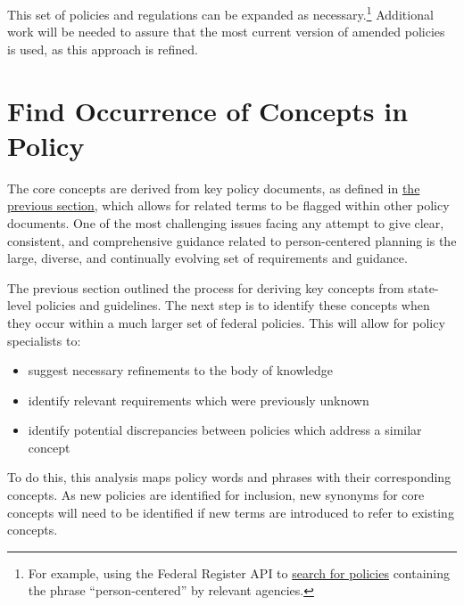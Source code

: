 \documentclass[
]{book}
\providecommand{\tightlist}{%
  \setlength{\itemsep}{0pt}\setlength{\parskip}{0pt}}
\begin{document}
This set of policies and regulations can be expanded as necessary.\footnote{For example, using the Federal Register API to \href{https://www.federalregister.gov/documents/search?conditions\%5Bagencies\%5D\%5B\%5D=centers-for-medicare-medicaid-services\&conditions\%5Bagencies\%5D\%5B\%5D=health-and-human-services-department\&conditions\%5Bagencies\%5D\%5B\%5D=substance-abuse-and-mental-health-services-administration\&conditions\%5Bterm\%5D=person-centered\&conditions\%5Btype\%5D\%5B\%5D=RULE\#}{search for policies} containing the phrase ``person-centered'' by relevant agencies.} Additional work will be needed to assure that the most current version of amended policies is used, as this approach is refined.

\hypertarget{find-occurrence-of-concepts-in-policy}{%
\section{Find Occurrence of Concepts in Policy}\label{find-occurrence-of-concepts-in-policy}}

The core concepts are derived from key policy documents, as defined in \protect\hyperlink{bok}{the previous section}, which allows for related terms to be flagged within other policy documents. One of the most challenging issues facing any attempt to give clear, consistent, and comprehensive guidance related to person-centered planning is the large, diverse, and continually evolving set of requirements and guidance.

The previous section outlined the process for deriving key concepts from state-level policies and guidelines. The next step is to identify these concepts when they occur within a much larger set of federal policies. This will allow for policy specialists to:

\begin{itemize}
\tightlist
\item
  suggest necessary refinements to the body of knowledge
\item
  identify relevant requirements which were previously unknown
\item
  identify potential discrepancies between policies which address a similar concept
\end{itemize}

To do this, this analysis maps policy words and phrases with their corresponding concepts. As new policies are identified for inclusion, new synonyms for core concepts will need to be identified if new terms are introduced to refer to existing concepts.
\end{document}
